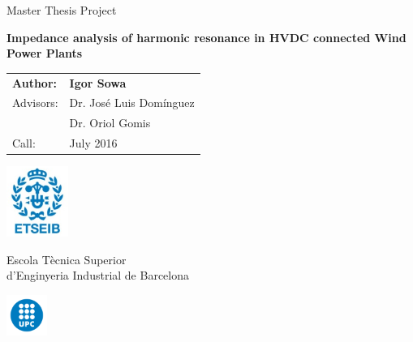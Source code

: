 \begin{titlepage}

    \begin{center}
        \vspace*{1cm}
        
        \LARGE
        Master Thesis Project
        
        \huge
        \textbf{Impedance analysis of harmonic resonance in HVDC connected Wind Power Plants}
        
        \vspace{3.5cm}

        \Large

		\begin{tabular}{l l}
  		\textbf{Author:}& \textbf{Igor Sowa}\\
  		Advisors:& Dr. Jos\'{e} Luis Dom\'{i}nguez \\
  		&Dr. Oriol Gomis \\[1ex]
		Call: & July 2016
		\end{tabular}

        \vfill
        
		\includegraphics[width=0.15\textwidth]{img/Logo_etseib.png}        
        
        \vspace{0.5cm}
        
		\LARGE
       	Escola T\`ecnica Superior\\
       	d'Enginyeria Industrial de Barcelona     
       	   
        \vspace{1.5cm}
        \includegraphics[width=0.1\textwidth]{img/Logo_upc.png}
        
    \end{center}
\end{titlepage}